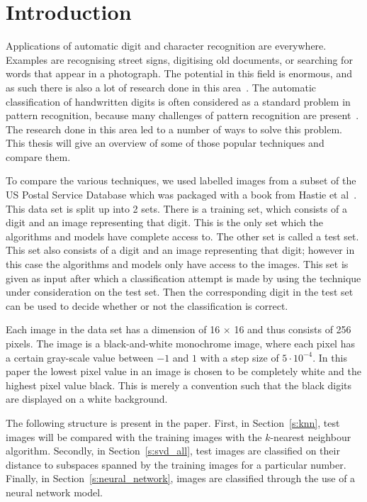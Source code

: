 \section{Introduction}\label{s:intro}
Applications of automatic digit and character recognition are everywhere. 
Examples are recognising street signs, digitising old documents, or searching for words that appear in a photograph. 
The potential in this field is enormous, and as such there is also a lot of research done in this area~\cite{Anthonissen, Savas2007, Ciresan2010, Cao2006}. 
The automatic classification of handwritten digits is often considered as a standard problem in pattern recognition, because many challenges of pattern recognition are present~\cite{Savas2007}.
The research done in this area led to a number of ways to solve this problem. 
This thesis will give an overview of some of those popular techniques and compare them.

To compare the various techniques, we used labelled images from a subset of the US Postal Service Database which was packaged with a book from Hastie et al~\cite{Hastie2009}. 
This data set is split up into 2 sets. 
There is a training set, which consists of a digit and an image representing that digit. 
This is the only set which the algorithms and models have complete access to. 
The other set is called a test set. 
This set also consists of a digit and an image representing that digit; however in this case the algorithms and models only have access to the images. 
This set is given as input after which a classification attempt is made by using the technique under consideration on the test set. 
Then the corresponding digit in the test set can be used to decide whether or not the classification is correct.

Each image in the data set has a dimension of 16 \(\times \) 16 and thus consists of 256 pixels.
The image is a black-and-white monochrome image, where each pixel has a certain gray-scale value between \(-1\) and \(1\) with a step size of \(5\cdot 10^{-4}\). 
In this paper the lowest pixel value in an image is chosen to be completely white and the highest pixel value black. 
This is merely a convention such that the black digits are displayed on a white background.

The following structure is present in the paper.
First, in Section~\ref{s:knn}, test images will be compared with the training images with the \(k\)-nearest neighbour algorithm.
Secondly, in Section~\ref{s:svd_all}, test images are classified on their distance to subspaces spanned by the training images for a particular number.
Finally, in Section~\ref{s:neural_network}, images are classified through the use of a neural network model.


